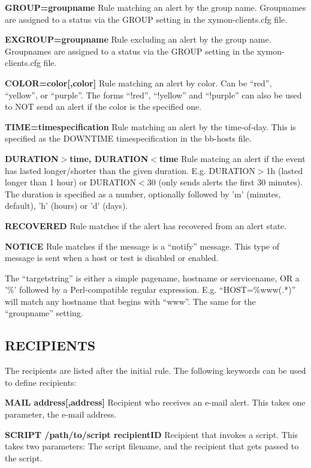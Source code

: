  \textbf{GROUP=groupname}
 Rule matching an alert by the group name. Groupnames are assigned to a status via the GROUP setting in the xymon-clients.cfg file. 


 \textbf{EXGROUP=groupname}
 Rule excluding an alert by the group name. Groupnames are assigned to a status via the GROUP setting in the xymon-clients.cfg file. 


 \textbf{COLOR=color[,color]}
 Rule matching an alert by color. Can be ``red'', ``yellow'', or ``purple''. The forms ``!red'', ``!yellow'' and ``!purple'' can also be used to NOT send an alert if the color is the specified one. 


 \textbf{TIME=timespecification}
 Rule matching an alert by the time-of-day. This is specified as the DOWNTIME timespecification in the bb-hosts file. 


 \textbf{DURATION$>$time, DURATION$<$time}
 Rule matcing an alert if the event has lasted longer/shorter than the given duration. E.g. DURATION$>$1h (lasted longer than 1 hour) or DURATION$<$30 (only sends alerts the first 30 minutes). The duration is specified as a number, optionally followed by 'm' (minutes, default), 'h' (hours) or 'd' (days). 


 \textbf{RECOVERED}
 Rule matches if the alert has recovered from an alert state. 


 \textbf{NOTICE}
 Rule matches if the message is a ``notify'' message. This type of message is sent when a host or test is disabled or enabled. 


  The ``targetstring'' is either a simple pagename, hostname or servicename, OR a '\%' followed by a Perl-compatible regular expression. E.g. ``HOST=\%www(.*)'' will match any hostname that begins with ``www''. The same for the ``groupname'' setting. 


 
\subsection{RECIPIENTS}
 The recipients are listed after the initial rule. The following keywords can be used to define recipients: 

 \textbf{MAIL address[,address]}
 Recipient who receives an e-mail alert. This takes one parameter, the e-mail address. 


 \textbf{SCRIPT /path/to/script recipientID}
 Recipient that invokes a script. This takes two parameters: The script filename, and the recipient that gets passed to the script. 


